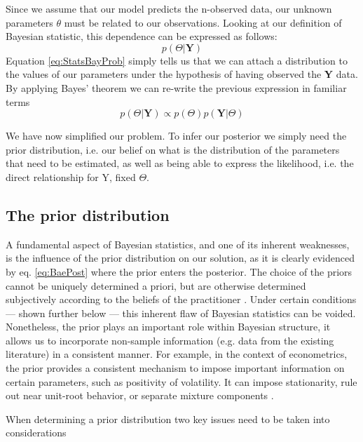 \documentclass[letterpaper]{article}
\begin{document}
Since we assume that our model predicts the n-observed data, our unknown parameters \textbf{$\theta$} must be related to our observations. Looking at our definition of Bayesian statistic, this dependence can be expressed as follows:
\begin{equation}
p(\textbf{$\Theta$}|\textbf{Y})
\label{eq:StatsBayProb}
\end{equation}
Equation \ref{eq:StatsBayProb} simply tells us that we can attach a distribution to the values of our parameters under the hypothesis of having observed the \textbf{Y} data. By applying Bayes' theorem we can re-write the previous expression in familiar terms
\begin{equation}
p(\textbf{$\Theta$}|\textbf{Y}) \propto p(\textbf{$\Theta$})p(\textbf{Y}|\textbf{$\Theta$})
\label{eq:BaePost}
\end{equation}

We have now simplified our problem. To infer our posterior we simply need the prior distribution, i.e. our belief on what is the distribution of the parameters that need to be estimated, as well as being able to express the likelihood, i.e. the direct relationship for Y, fixed $\Theta$.

\subsection{The prior distribution}
A fundamental aspect of Bayesian statistics, and one of its inherent weaknesses, is the influence of the prior distribution on our solution, as it is clearly evidenced by eq. \ref{eq:BaePost} where the prior enters the posterior. The choice of the priors cannot be uniquely determined a priori, but are otherwise determined subjectively according to the beliefs of the practitioner \cite{gelman2008}. Under certain conditions --- shown further below --- this inherent flaw of Bayesian statistics can be voided. Nonetheless, the prior plays an important role within Bayesian structure, it allows us to incorporate non-sample information (e.g. data from the existing literature) in a consistent manner. For example, in the context of econometrics, the prior provides a consistent mechanism to impose important information on certain parameters, such as positivity of volatility. It can impose stationarity, rule out near unit-root behavior, or separate mixture components \cite{johannes2003}. 

When determining a prior distribution two key issues need to be taken into considerations
\end{document}
